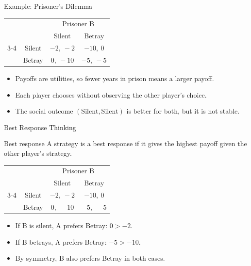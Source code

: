 \documentclass[10pt,aspectratio=169]{beamer}
\newcommand{\pay}[2]{#1,\ #2}
\begin{document}
\begin{frame}{Example: Prisoner's Dilemma}
\begin{center}
\begin{tabular}{c c c c}
 & & \multicolumn{2}{c}{Prisoner B}\\
 & & Silent & Betray\\
\cmidrule{3-4}
\multirow{2}{*}{Prisoner A} & Silent & $\pay{-2}{-2}$ & $\pay{-10}{0}$\\
 & Betray & $\pay{0}{-10}$ & $\pay{-5}{-5}$\\
\end{tabular}
\end{center}
\vspace{0.3cm}
\begin{itemize}
  \item Payoffs are utilities, so fewer years in prison means a larger payoff.
  \item Each player chooses without observing the other player's choice.
  \item The social outcome $(\text{Silent}, \text{Silent})$ is better for both, but it is not stable.
\end{itemize}
\end{frame}

\begin{frame}{Best Response Thinking}
\begin{block}{Best response}
A strategy is a best response if it gives the highest payoff given the other player's strategy.
\end{block}
\vspace{0.2cm}
\begin{center}
\begin{tabular}{c c c c}
 & & \multicolumn{2}{c}{Prisoner B}\\
 & & Silent & Betray\\
\cmidrule{3-4}
\multirow{2}{*}{Prisoner A} & Silent & $\pay{-2}{-2}$ & $\pay{-10}{0}$\\
 & Betray & $\pay{0}{-10}$ & $\pay{-5}{-5}$\\
\end{tabular}
\end{center}
\vspace{0.2cm}
\begin{itemize}
  \item If B is silent, A prefers Betray: $0>-2$.
  \item If B betrays, A prefers Betray: $-5>-10$.
  \item By symmetry, B also prefers Betray in both cases.
\end{itemize}
\end{frame}
\end{document}
